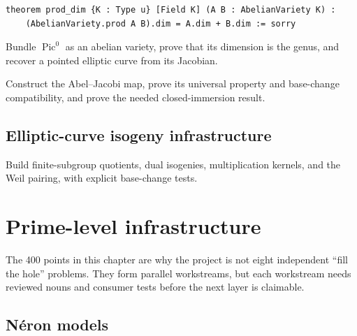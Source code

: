 \begin{verbatim}
theorem prod_dim {K : Type u} [Field K] (A B : AbelianVariety K) :
    (AbelianVariety.prod A B).dim = A.dim + B.dim := sorry
\end{verbatim}

\begin{milestone}\label{node:MT-TC-E1-JACOBIAN-VARIETY}
Bundle \(\operatorname{Pic}^0\) as an abelian variety, prove that its dimension
is the genus, and recover a pointed elliptic curve from its Jacobian.
\leanpending
\end{milestone}

\begin{theorem}\label{node:MT-TC-F1-ABEL-JACOBI}
Construct the Abel--Jacobi map, prove its universal property and base-change
compatibility, and prove the needed closed-immersion result.
\leanpending
\end{theorem}

\section{Elliptic-curve isogeny infrastructure}

\begin{milestone}\label{node:MT-EC-ISOGENY-WEIL}
Build finite-subgroup quotients, dual isogenies, multiplication kernels, and
the Weil pairing, with explicit base-change tests.
\leanpending
\end{milestone}

\chapter{Prime-level infrastructure}

The 400 points in this chapter are why the project is not eight independent
``fill the hole'' problems.  They form parallel workstreams, but each
workstream needs reviewed nouns and consumer tests before the next layer is
claimable.

\section{N\'eron models}

